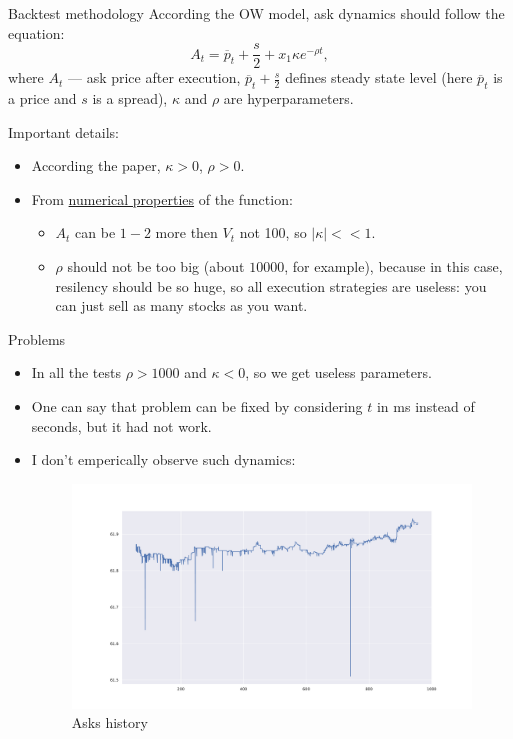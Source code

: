 \documentclass[aspectratio=169]{beamer}
\begin{document}
\begin{frame}{Backtest methodology}
    According the OW model, ask dynamics should follow the equation:
    \begin{equation*}
        A_t = \overline p _t + \frac{s}{2} + x_1 \kappa e^{- \rho t},
    \end{equation*}
    where $A_t$ --- ask price after execution, $\overline p _t + \frac{s}{2}$ defines steady state level 
    (here $\overline p _t$ is a price and $s$ is a spread), $\kappa$ and $\rho$ are hyperparameters. \par
    Important details:
    \begin{itemize}
        \item According the paper, $\kappa > 0$, $\rho > 0$. 
        \item From \href{https://www.desmos.com/calculator?lang=ru}{numerical properties} of the function:
        \begin{itemize}
            \item $A_t$ can be $1-2$ more then $V_t$ not 100, so $|\kappa| << 1$. 
            \item $\rho$ should not be too big (about $10000$, for example), because in this case, resilency should be so huge, so all 
            execution strategies are useless: you can just sell as many stocks as you want.
        \end{itemize}
    \end{itemize}
\end{frame}

\begin{frame}{Problems}

    \begin{itemize}
        \item In all the tests $\rho > 1000$ and $\kappa < 0$, so we get useless parameters. 
        \item One can say that problem can be fixed by considering $t$ in ms instead of seconds, but it had not work.
        \item I don't emperically observe such dynamics:
        \begin{figure}
            \includegraphics[scale=0.25]{figs/AsksHistory.pdf}
            \caption{Asks history}
            \label{fig:mvslim}
        \end{figure}
    \end{itemize}
\end{frame}
\end{document}
